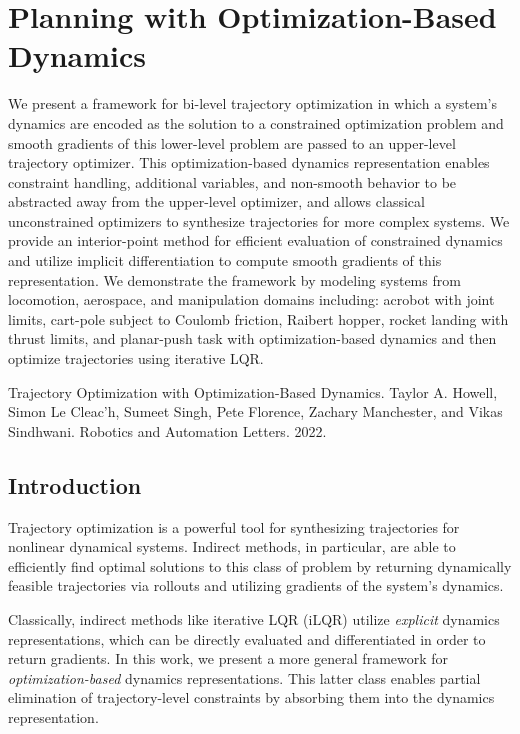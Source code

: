 \chapter{Planning with Optimization-Based Dynamics}

We present a framework for bi-level trajectory optimization in which a system's dynamics are encoded as the solution to a constrained optimization problem and smooth gradients of this lower-level problem are passed to an upper-level trajectory optimizer. This optimization-based dynamics representation enables constraint handling, additional variables, and non-smooth behavior to be abstracted away from the upper-level optimizer, and allows classical unconstrained optimizers to synthesize trajectories for more complex systems. We provide an interior-point method for efficient evaluation of constrained dynamics and utilize implicit differentiation to compute smooth gradients of this representation. We demonstrate the framework by modeling systems from locomotion, aerospace, and manipulation domains including: acrobot with joint limits, cart-pole subject to Coulomb friction, Raibert hopper, rocket landing with thrust limits, and planar-push task with optimization-based dynamics and then optimize trajectories using iterative LQR.

\vspace*{\fill}

\noindent Trajectory Optimization with Optimization-Based Dynamics. Taylor A. Howell, Simon Le Cleac'h, Sumeet Singh, Pete Florence, Zachary Manchester, and Vikas Sindhwani. Robotics and Automation Letters. 2022.

\pagebreak

\section{Introduction}
Trajectory optimization is a powerful tool for synthesizing trajectories for nonlinear dynamical systems. Indirect methods, in particular, are able to efficiently find optimal solutions to this class of problem by returning dynamically feasible trajectories via rollouts and utilizing gradients of the system's dynamics.

Classically, indirect methods like iterative LQR (iLQR) \cite{jacobson1970differential} utilize \textit{explicit} dynamics representations, which can be directly evaluated and differentiated in order to return gradients. In this work, we present a more general framework for \textit{optimization-based} dynamics representations. This latter class enables partial elimination of trajectory-level constraints by absorbing them into the dynamics representation.

